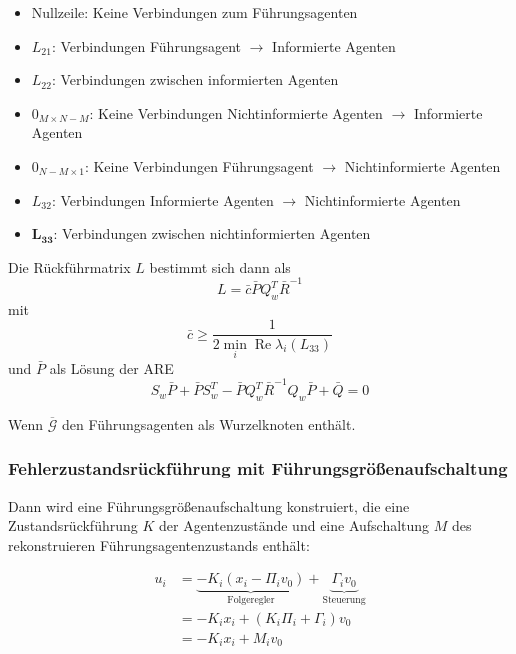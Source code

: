 \begin{itemize}
    \item Nullzeile: Keine Verbindungen zum Führungsagenten
    \item $L_{21}$: Verbindungen Führungsagent $\rightarrow$ Informierte Agenten
    \item $L_{22}$: Verbindungen zwischen informierten Agenten
    \item $0_{M \times N-M}$: Keine Verbindungen Nichtinformierte Agenten $\rightarrow$ Informierte Agenten
    \item $0_{N-M \times 1}$: Keine Verbindungen Führungsagent $\rightarrow$ Nichtinformierte Agenten
    \item $L_{32}$: Verbindungen Informierte Agenten $\rightarrow$ Nichtinformierte Agenten
    \item $\bm{L_{33}}$: Verbindungen zwischen nichtinformierten Agenten
\end{itemize}

Die Rückführmatrix $L$ bestimmt sich dann als
\begin{equation}
    L= \bar{c} \bar{P} Q_w^T \bar{R}^{-1}
\end{equation}
mit
\begin{equation}
    \bar{c} \geq \frac{1}{2 \min_{i}\operatorname{Re} \lambda_i(L_{33})}
\end{equation}
und $\bar{P}$ als Lösung der ARE
\begin{equation}
    S_w \bar{P} + \bar{P} S_w^T - \bar{P} Q_w^T \bar{R}^{-1} Q_w \bar{P} + \bar{Q} = 0
\end{equation}

Wenn $\overbar{\mathcal{G}}$ den Führungsagenten als Wurzelknoten enthält.

\subsubsection{Fehlerzustandsrückführung mit Führungsgrößenaufschaltung}
\label{sec:heterogen_regler}

Dann wird eine Führungsgrößenaufschaltung konstruiert, die eine Zustandsrückführung $K$
der Agentenzustände und eine Aufschaltung $M$ des rekonstruieren
Führungsagentenzustands enthält:

\begin{align}
    u_i &= \underbrace{-K_i (x_i - \Pi_i v_0)}_\text{Folgeregler}
    + \underbrace{\Gamma_i v_0}_\text{Steuerung} \\
    &= -K_i x_i + (K_i \Pi_i + \Gamma_i) v_0 \\
    &= -K_i x_i + M_i v_0
\end{align}

